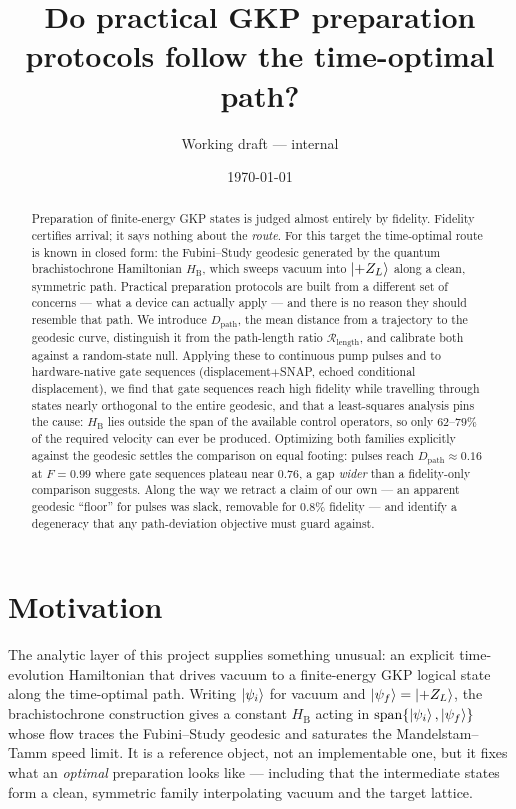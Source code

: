 \documentclass[10pt]{article}
\title{Do practical GKP preparation protocols follow the time-optimal path?}
\author{Working draft --- internal}
\date{\today}
\newcommand{\Dpath}{D_{\mathrm{path}}}
\newcommand{\Rlen}{\mathcal{R}_{\mathrm{length}}}
\newcommand{\HB}{H_{\mathrm{B}}}
\newcommand{\zL}{\ket{{+}Z_L}}
\begin{document}
\maketitle

\begin{abstract}
Preparation of finite-energy GKP states is judged almost entirely by fidelity.
Fidelity certifies arrival; it says nothing about the \emph{route}. For this
target the time-optimal route is known in closed form: the Fubini--Study geodesic
generated by the quantum brachistochrone Hamiltonian $\HB$, which sweeps vacuum
into $\zL$ along a clean, symmetric path. Practical preparation protocols are
built from a different set of concerns --- what a device can actually apply ---
and there is no reason they should resemble that path. We introduce $\Dpath$, the
mean distance from a trajectory to the geodesic curve, distinguish it from the
path-length ratio $\Rlen$, and calibrate both against a random-state null. Applying
these to continuous pump pulses and to hardware-native gate sequences
(displacement$+$SNAP, echoed conditional displacement), we find that gate
sequences reach high fidelity while travelling through states nearly orthogonal
to the entire geodesic, and that a least-squares analysis pins the cause: $\HB$
lies outside the span of the available control operators, so only $62$--$79\%$ of
the required velocity can ever be produced. Optimizing both families explicitly against the geodesic settles the
comparison on equal footing: pulses reach $\Dpath\approx0.16$ at $F=0.99$ where
gate sequences plateau near $0.76$, a gap \emph{wider} than a fidelity-only
comparison suggests. Along the way we retract a claim of our own --- an apparent
geodesic ``floor'' for pulses was slack, removable for $0.8\%$ fidelity --- and
identify a degeneracy that any path-deviation objective must guard against.
\end{abstract}

\section{Motivation}

The analytic layer of this project supplies something unusual: an explicit
time-evolution Hamiltonian that drives vacuum to a finite-energy GKP logical state
along the time-optimal path. Writing $\ket{\psi_i}$ for vacuum and
$\ket{\psi_f}=\zL$, the brachistochrone construction gives a constant $\HB$ acting
in $\mathrm{span}\{\ket{\psi_i},\ket{\psi_f}\}$ whose flow traces the Fubini--Study
geodesic and saturates the Mandelstam--Tamm speed limit. It is a reference object,
not an implementable one, but it fixes what an \emph{optimal} preparation looks
like --- including that the intermediate states form a clean, symmetric family
interpolating vacuum and the target lattice.
\end{document}
